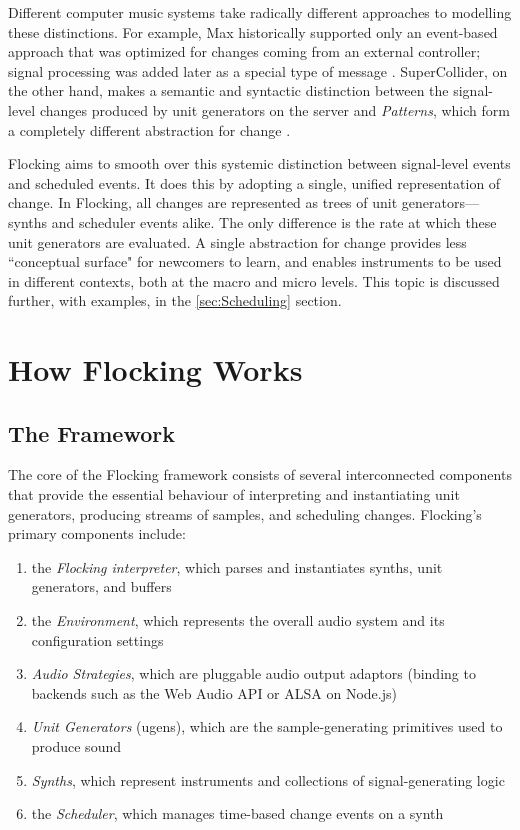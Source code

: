 \documentclass{article}
\begin{document}
Different computer music systems take radically different approaches to modelling these distinctions. For example, Max historically supported only an event-based approach that was optimized for changes coming from an external controller; signal processing was added later as a special type of message \cite{puckette2002max}.
SuperCollider, on the other hand, makes a semantic and syntactic distinction between the signal-level changes produced by unit generators on the server \cite{mccartney1996supercollider} and {\it Patterns}, which form a completely different abstraction for change \cite[pp. 189]{wilson2011supercollider}.

Flocking aims to smooth over this systemic distinction between signal-level events and scheduled events. It does this by adopting a single, unified representation of change. In Flocking, all changes are represented as trees of unit generators---synths and scheduler events alike. The only difference is the rate at which these unit generators are evaluated. A single abstraction for change provides less ``conceptual surface" for newcomers to learn, and enables instruments to be used in different contexts, both at the macro and micro levels. This topic is discussed further, with examples, in the \ref{sec:Scheduling} section.

\section{How Flocking Works}

\subsection{The Framework}

The core of the Flocking framework consists of several interconnected components that provide the essential behaviour of interpreting and instantiating unit generators, producing streams of samples, and scheduling changes. Flocking's primary components include:

\begin{enumerate}
\item the {\it Flocking interpreter}, which parses and instantiates synths, unit generators, and buffers
\item the {\it Environment}, which represents the overall audio system and its configuration settings
\item {\it Audio Strategies}, which are pluggable audio output adaptors (binding to backends such as the Web Audio API or ALSA on Node.js)
\item {\it Unit Generators} (ugens), which are the sample-generating primitives used to produce sound
\item {\it Synths}, which represent instruments and collections of signal-generating logic
\item the {\it Scheduler}, which manages time-based change events on a synth
\end{enumerate}
\end{document}
